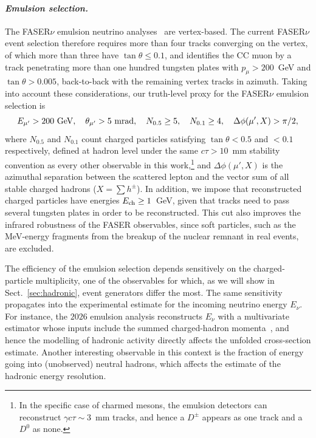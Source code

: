 \paragraph{\it Emulsion selection.}  
%
The FASER$\nu$ emulsion neutrino analyses~\cite{FASER:2024hoe,FASER:2026nu680} are vertex-based.
%
The current FASER$\nu$ event selection therefore requires more than four tracks converging on the vertex, of which more than three have $\tan\theta \le 0.1$, and identifies the CC muon by a track penetrating more than one hundred tungsten plates with $p_\mu > 200$~GeV and $\tan\theta > 0.005$, back-to-back with the remaining vertex tracks in azimuth.
%
Taking into account these considerations, 
our truth-level proxy for the FASER$\nu$ emulsion selection is 
\begin{equation}
  E_{\mu'} > 200~{\rm GeV} , \quad
  \theta_{\mu'} > 5~{\rm mrad} , \quad
  N_{0.5} \ge 5 , \quad N_{0.1} \ge 4 , \quad
  \Delta\phi(\mu', X) > \pi/2 ,
  \label{eq:tierE}
\end{equation}
where $N_{0.5}$ and $N_{0.1}$ count charged particles satisfying $\tan\theta < 0.5$ and $<0.1$ respectively, defined at hadron level under the same $c\tau > 10$~mm stability convention as every other observable in this work,\footnote{In the specific case of charmed mesons, the emulsion detectors can reconstruct $\gamma c\tau \sim 3$~mm tracks, and hence a $D^\pm$ appears as one track and a $D^0$ as none. } and $\Delta\phi(\mu', X)$ is the azimuthal separation between the scattered lepton and the vector sum of all stable charged hadrons ($X=\sum h^\pm$).  
%
In addition, we impose that reconstructed charged particles have energies $E_{\rm ch}\ge 1$~GeV, given that tracks need to pass several tungsten plates in order to be reconstructed.
%
This cut also improves the infrared robustness of the FASER observables, since soft particles, such as the MeV-energy fragments from the breakup of the nuclear remnant in real events, are excluded.

The efficiency of the emulsion selection depends sensitively 
on the charged-particle multiplicity, one of the observables for which, as we will show in Sect.~\ref{sec:hadronic}, event generators differ the most. 
%
The same sensitivity propagates into the
experimental estimate for the incoming neutrino energy $E_\nu$.
%
For instance,  the $2026$ emulsion analysis reconstructs $E_\nu$ with a multivariate estimator whose inputs include the summed
charged-hadron momenta~\cite{FASER:2026nu680}, and hence the modelling of hadronic activity directly affects
the unfolded cross-section estimate. 
%
Another interesting observable in this context is the fraction of energy going into (unobserved) neutral hadrons, which affects the estimate of the hadronic energy resolution.


